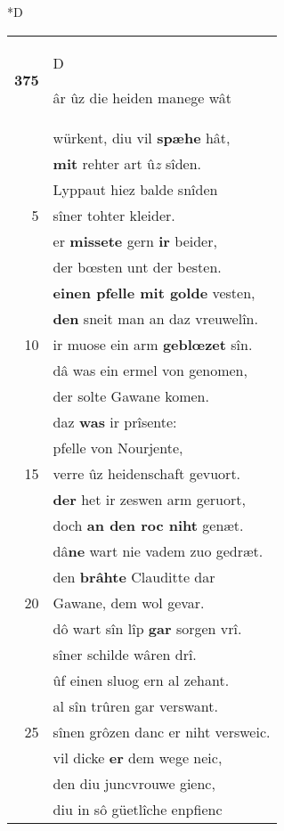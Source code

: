 \documentclass[8pt,a4paper,notitlepage]{article}
\begin{document}
\begin{table}[ht]
\begin{minipage}[t]{0.5\linewidth}
\small
\begin{center}*D
\end{center}
\begin{tabular}{rl}
\textbf{375} & \begin{large}D\end{large}âr ûz die heiden manege wât\\ 
 & würkent, diu vil \textbf{spæhe} hât,\\ 
 & \textbf{mit} rehter art û\textit{z} sîden.\\ 
 & Lyppaut hiez balde snîden\\ 
5 & sîner tohter kleider.\\ 
 & er \textbf{missete} gern \textbf{ir} beider,\\ 
 & der bœsten unt der besten.\\ 
 & \textbf{einen pfelle mit golde} vesten,\\ 
 & \textbf{den} sneit man an daz vreuwelîn.\\ 
10 & ir muose ein arm \textbf{geblœzet} sîn.\\ 
 & dâ was ein ermel von genomen,\\ 
 & der solte Gawane komen.\\ 
 & daz \textbf{was} ir prîsente:\\ 
 & pfelle von Nourjente,\\ 
15 & verre ûz heidenschaft gevuort.\\ 
 & \textbf{der} het ir zeswen arm geruort,\\ 
 & doch \textbf{an den roc niht} genæt.\\ 
 & dâ\textbf{ne} wart nie vadem zuo gedræt.\\ 
 & den \textbf{brâhte} Clauditte dar\\ 
20 & Gawane, dem wol gevar.\\ 
 & dô wart sîn lîp \textbf{gar} sorgen vrî.\\ 
 & sîner schilde wâren drî.\\ 
 & ûf einen sluog ern al zehant.\\ 
 & al sîn trûren gar verswant.\\ 
25 & sînen grôzen danc er niht versweic.\\ 
 & vil dicke \textbf{er} dem wege neic,\\ 
 & den diu juncvrouwe gienc,\\ 
 & diu in sô güetlîche enpfienc\\ 

\end{tabular}
\end{minipage}
\end{table}
\end{document}
